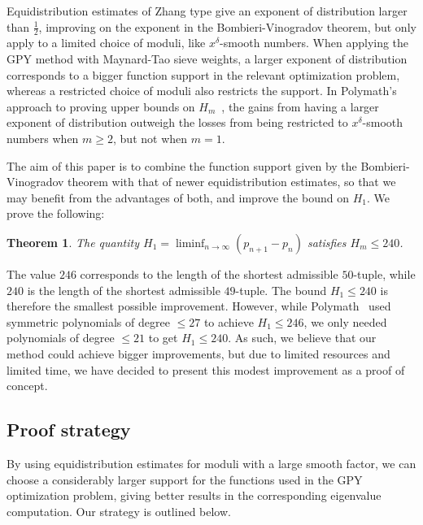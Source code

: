 \documentclass{amsart}
\newtheorem{thm}{Theorem}
\numberwithin{equation}{section}
\begin{document}
 \medskip 
 Equidistribution estimates of Zhang type give an exponent of distribution larger than $\frac{1}{2}$,  improving on the exponent in the  Bombieri-Vinogradov theorem, but  only apply to a limited choice of moduli, like  $x^{\delta}$-smooth numbers.   When applying the GPY method with Maynard-Tao sieve weights, a larger exponent of distribution corresponds to a bigger function support in the relevant optimization problem, whereas a restricted choice of moduli also restricts the support. 
 In Polymath's approach to proving upper bounds on $H_m$~\cite{Polymath:2014:VSS}, the gains from having a larger exponent of distribution outweigh the losses from being restricted to  $x^{\delta}$-smooth numbers when $m\geq 2$, but not  when $m=1$. 
 
 \medskip The aim of this paper is to combine the function support given by the Bombieri-Vinogradov theorem with that of newer equidistribution estimates, so that we may   benefit from the advantages of both, and improve the bound on $H_1$. We prove the following:

\begin{thm} \label{thm}
The quantity $H_1=\liminf_{n \rightarrow \infty} (p_{n+1}-p_n)$ satisfies $ H_m \leq 240$. 
\end{thm}

The value $246$ corresponds to the length of the shortest admissible $50$-tuple, while $240$ is the length of the shortest admissible $49$-tuple. The bound $H_1 \leq 240$ is therefore the smallest possible improvement. However, while Polymath~\cite{Polymath:2014:VSS} used symmetric polynomials of degree $\leq 27$ to achieve $H_1 \leq 246$, we only needed polynomials of degree $\leq 21$ to get $H_1 \leq 240$. As such,  we believe that  our method could achieve bigger improvements, but due to limited  resources and limited time, we have decided to present this modest improvement as a proof of concept.

\subsection{Proof strategy} By using   equidistribution estimates for moduli with a large smooth factor, we can choose a considerably larger support for the functions used in the GPY optimization problem, giving better results in the corresponding eigenvalue computation. Our strategy is   outlined below.
 
 
 \medskip
 
\end{document}
